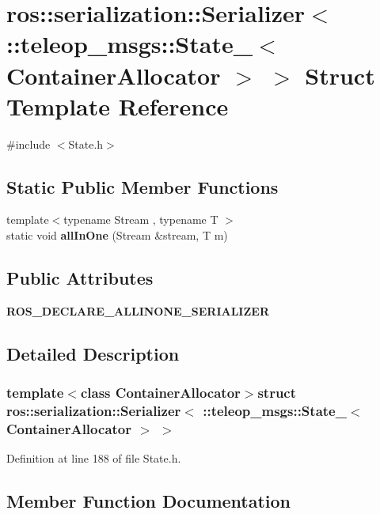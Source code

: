 \section{ros::serialization::Serializer$<$ ::teleop\_\-msgs::State\_\-$<$ ContainerAllocator $>$ $>$ Struct Template Reference}
\label{structros_1_1serialization_1_1Serializer_3_01_1_1teleop__msgs_1_1State___3_01ContainerAllocator_01_4_01_4}


{\ttfamily \#include $<$State.h$>$}

\subsection*{Static Public Member Functions}
\begin{DoxyCompactItemize}
\item 
{\footnotesize template$<$typename Stream , typename T $>$ }\\static void {\bf allInOne} (Stream \&stream, T m)
\end{DoxyCompactItemize}
\subsection*{Public Attributes}
\begin{DoxyCompactItemize}
\item 
{\bf ROS\_\-DECLARE\_\-ALLINONE\_\-SERIALIZER}
\end{DoxyCompactItemize}


\subsection{Detailed Description}
\subsubsection*{template$<$class ContainerAllocator$>$struct ros::serialization::Serializer$<$ ::teleop\_\-msgs::State\_\-$<$ ContainerAllocator $>$ $>$}



Definition at line 188 of file State.h.



\subsection{Member Function Documentation}
